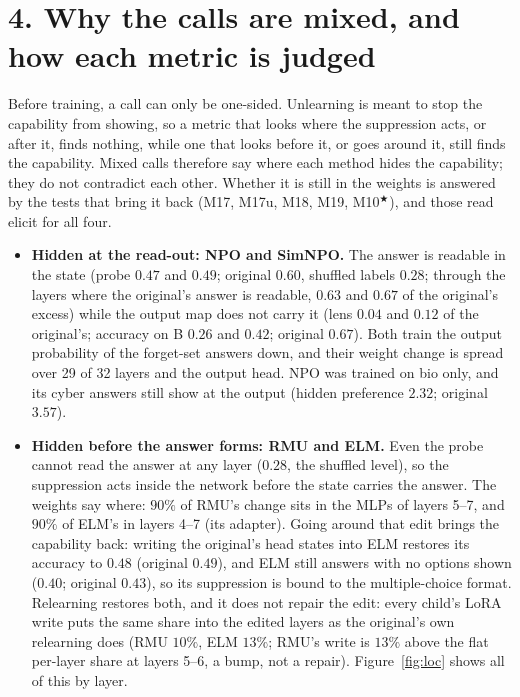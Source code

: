 \documentclass[11pt]{article}
\newenvironment{steps}{\begin{itemize}[nosep,leftmargin=1.2em,topsep=2pt]}{\end{itemize}}
\begin{document}
\FloatBarrier
\section*{4. Why the calls are mixed, and how each metric is judged}

Before training, a call can only be one-sided. Unlearning is meant to stop the capability from
showing, so a metric that looks where the suppression acts, or after it, finds nothing, while one
that looks before it, or goes around it, still finds the capability. Mixed calls therefore say where
each method hides the capability; they do not contradict each other. Whether it is still in the
weights is answered by the tests that bring it back (M17, M17u, M18, M19, M10$^\bigstar$), and those
read elicit for all four.

\begin{steps}
\item \textbf{Hidden at the read-out: NPO and SimNPO.} The answer is readable in the state (probe
$0.47$ and $0.49$; original $0.60$, shuffled labels $0.28$; through the layers where the original's
answer is readable, $0.63$ and $0.67$ of the original's excess) while the output map does not carry
it (lens $0.04$ and $0.12$ of the original's; accuracy on B $0.26$ and $0.42$; original $0.67$). Both
train the output probability of the forget-set answers down, and their weight change is spread over
29 of 32 layers and the output head. NPO was trained on bio only, and its cyber answers still show
at the output (hidden preference $2.32$; original $3.57$).
\item \textbf{Hidden before the answer forms: RMU and ELM.} Even the probe cannot read the answer at
any layer ($0.28$, the shuffled level), so the suppression acts inside the network before the state
carries the answer. The weights say where: $90\%$ of RMU's change sits in the MLPs of layers 5--7,
and $90\%$ of ELM's in layers 4--7 (its adapter). Going around that edit brings the capability back:
writing the original's head states into ELM restores its accuracy to $0.48$ (original $0.49$), and
ELM still answers with no options shown ($0.40$; original $0.43$), so its suppression is bound to the
multiple-choice format. Relearning restores both, and it does not repair the edit: every child's
LoRA write puts the same share into the edited layers as the original's own relearning does (RMU
$10\%$, ELM $13\%$; RMU's write is $13\%$ above the flat per-layer share at layers 5--6, a bump, not a
repair). Figure~\ref{fig:loc} shows all of this by layer.
\end{steps}
\end{document}
